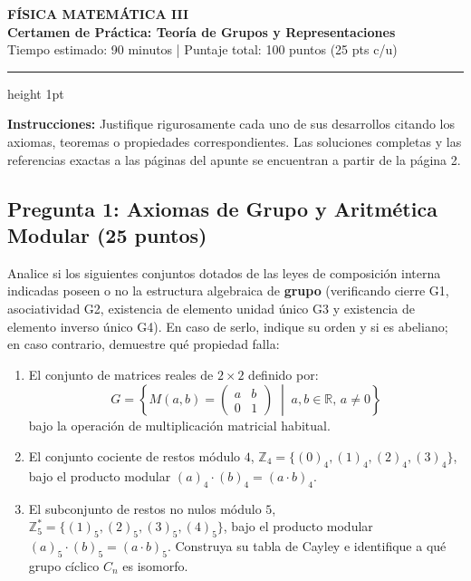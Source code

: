 \documentclass[11pt, a4paper]{article}
\begin{document}
\begin{center}
    {\Large \textbf{\textcolor{primary}{FÍSICA MATEMÁTICA III}}}\\[4pt]
    {\large \textbf{Certamen de Práctica: Teoría de Grupos y Representaciones}}\\[6pt]
    {\small \textcolor{secondary}{Tiempo estimado: 90 minutos \quad | \quad Puntaje total: 100 puntos (25 pts c/u)}}
\end{center}
\vspace{2mm}
\hrule height 1pt
\vspace{4mm}

\noindent \textbf{Instrucciones:} Justifique rigurosamente cada uno de sus desarrollos citando los axiomas, teoremas o propiedades correspondientes. Las soluciones completas y las referencias exactas a las páginas del apunte se encuentran a partir de la página 2.

\vspace{4mm}

\subsection*{\textcolor{primary}{Pregunta 1: Axiomas de Grupo y Aritmética Modular (25 puntos)}}
Analice si los siguientes conjuntos dotados de las leyes de composición interna indicadas poseen o no la estructura algebraica de \textbf{grupo} (verificando cierre G1, asociatividad G2, existencia de elemento unidad único G3 y existencia de elemento inverso único G4). En caso de serlo, indique su orden y si es abeliano; en caso contrario, demuestre qué propiedad falla:
\begin{enumerate}[label=\textbf{\alph*)}]
    \item El conjunto de matrices reales de $2\times 2$ definido por:
    \[
    G = \left\{ M(a,b) = \begin{pmatrix} a & b \\ 0 & 1 \end{pmatrix} \;\middle|\; a, b \in \mathbb{R}, \, a \neq 0 \right\}
    \]
    bajo la operación de multiplicación matricial habitual.
    \item El conjunto cociente de restos módulo $4$, $\mathbb{Z}_4 = \{(0)_4, (1)_4, (2)_4, (3)_4\}$, bajo el producto modular $(a)_4 \cdot (b)_4 = (a \cdot b)_4$.
    \item El subconjunto de restos no nulos módulo $5$, $\mathbb{Z}_5^* = \{(1)_5, (2)_5, (3)_5, (4)_5\}$, bajo el producto modular $(a)_5 \cdot (b)_5 = (a \cdot b)_5$. Construya su tabla de Cayley e identifique a qué grupo cíclico $C_n$ es isomorfo.
\end{enumerate}
\end{document}
